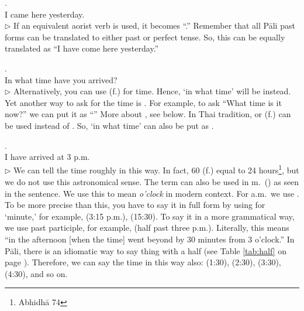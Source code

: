 \medskip
{}. \\
\hspace*{12mm}I came here yesterday.\\
{\small $\triangleright$ If an equivalent aorist verb is used, it becomes ``.'' Remember that all P\=ali past forms can be translated to either past or perfect tense. So, this can be equally translated as ``I have come here yesterday.''}

\medskip
{}. \\
\hspace*{12mm}In what time have you arrived?\\
{\small $\triangleright$ Alternatively, you can use  (f.) for time. Hence, `in what time' will be  instead. Yet another way to ask for the time is . For example, to ask ``What time is it now?'' we can put it as ``'' More about , see below. In Thai tradition,  or  (f.) can be used instead of . So, `in what time' can also be put as .}

\label{conv:time}\medskip
{}. \\
\hspace*{12mm}I have arrived at 3 p.m.\\
{\small $\triangleright$ We can tell the time roughly in this way. In fact, 60  (f.) equal to 24 hours\footnote{Abhidh\=a 74}, but we do not use this astronomical sense. The term can also be used in m.\ () as seen in the sentence. We use this to mean \emph{o'clock} in modern context. For a.m.\ we use . To be more precise than this, you have to say it in full form by using  for `minute,' for example,  (3:15 p.m.),  (15:30). To say it in a more grammatical way, we use past participle, for example,  (half past three p.m.). Literally, this means ``in the afternoon [when the time] went beyond by 30 minutes from 3 o'clock.'' In P\=ali, there is an idiomatic way to say thing with a half (see Table \ref{tab:half} on page \pageref{tab:half}). Therefore, we can say the time in this way also:  (1:30),  (2:30),  (3:30),  (4:30), and so on.}

